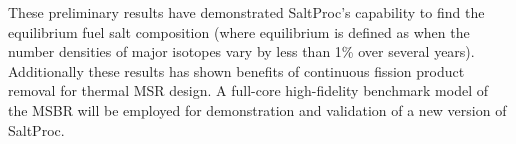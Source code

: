 These preliminary results have demonstrated SaltProc's capability to find 
the equilibrium fuel salt 
composition (where equilibrium is defined as when the number densities of major 
isotopes vary by less than 1\% over several years). Additionally these results
has shown benefits of continuous fission product removal for 
thermal \gls{MSR} design. A full-core high-fidelity benchmark model 
of the \gls{MSBR} will be employed for demonstration and validation of a new 
version of SaltProc.
